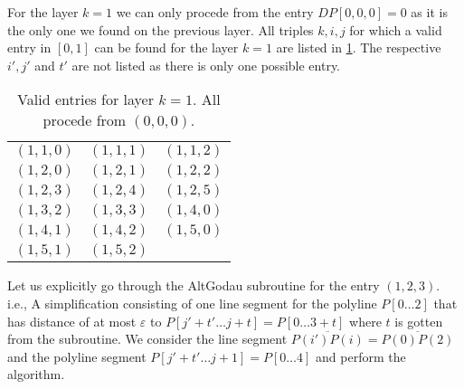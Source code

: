 For the layer \(k = 1\) we can only procede from the entry \(DP[0,0,0] = 0\) as it is the only one we found on the previous layer. All triples \(k, i, j\) for which a valid entry in \([0, 1]\) can be found for the layer \(k = 1\) are listed in \cref{tab:exlayer1}. The respective \(i', j'\) and \(t'\) are not listed as there is only one possible entry.
\begin{table}[h]
\centering
\begin{tabular}{|ccc|}
\hline
$(1,1,0)$ & $(1,1,1)$ & $(1,1,2)$ \\
$(1,2,0)$ & $(1,2,1)$ & $(1,2,2)$ \\
$(1,2,3)$ & $(1,2,4)$ & $(1,2,5)$ \\
$(1,3,2)$ & $(1,3,3)$ & $(1,4,0)$ \\
$(1,4,1)$ & $(1,4,2)$ & $(1,5,0)$ \\
$(1,5,1)$ & $(1,5,2)$ & \\
\hline
\end{tabular}
\caption{Valid entries for layer \(k = 1\). All procede from \((0,0,0)\).}
\label{tab:exlayer1}
\end{table}

Let us explicitly go through the AltGodau subroutine for the entry \((1, 2, 3)\). i.e., A simplification consisting of one line segment for the polyline \(P[0\dots 2]\) that has distance of at most \(\varepsilon\) to \(P[j' + t'\dots j + t] = P[0 \dots 3 + t]\) where \(t\) is gotten from the subroutine. We consider the line segment \(\overline{P(i')P(i)} = \overline{P(0)P(2)}\) and the polyline segment \(P[j' + t' \dots j + 1] = P[0 \dots 4]\) and perform the algorithm. 

